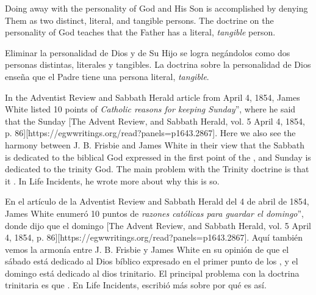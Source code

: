 Doing away with the personality of God and His Son is accomplished by denying Them as two distinct, literal, and tangible persons. The doctrine on the personality of God teaches that the Father has a literal, \textit{tangible} person.


Eliminar la personalidad de Dios y de Su Hijo se logra negándolos como dos personas distintas, literales y tangibles. La doctrina sobre la personalidad de Dios enseña que el Padre tiene una persona literal, \textit{tangible}.


In the Adventist Review and Sabbath Herald article from April 4, 1854, James White listed 10 points of \textit{Catholic reasons for keeping Sunday}”, where he said that the Sunday [The Advent Review, and Sabbath Herald, vol. 5 April 4, 1854, p. 86][https://egwwritings.org/read?panels=p1643.2867]. Here we also see the harmony between J. B. Frisbie and James White in their view that the Sabbath is dedicated to the biblical God expressed in the first point of the , and Sunday is dedicated to the trinity God. The main problem with the Trinity doctrine is that it . In Life Incidents, he wrote more about why this is so.


En el artículo de la Adventist Review and Sabbath Herald del 4 de abril de 1854, James White enumeró 10 puntos de \textit{razones católicas para guardar el domingo}”, donde dijo que el domingo [The Advent Review, and Sabbath Herald, vol. 5 April 4, 1854, p. 86][https://egwwritings.org/read?panels=p1643.2867]. Aquí también vemos la armonía entre J. B. Frisbie y James White en su opinión de que el sábado está dedicado al Dios bíblico expresado en el primer punto de los , y el domingo está dedicado al dios trinitario. El principal problema con la doctrina trinitaria es que . En Life Incidents, escribió más sobre por qué es así.


